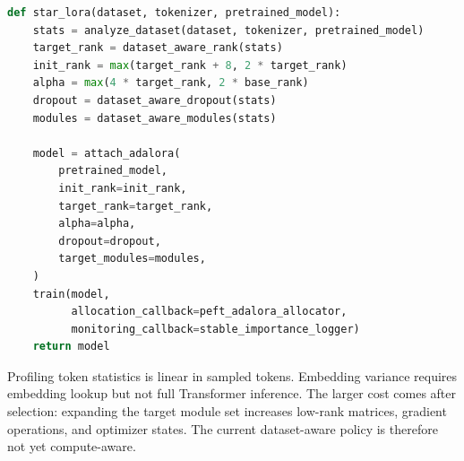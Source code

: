 \begin{lstlisting}[language=Python,caption={High-level Star-LoRA procedure.},label={lst:algorithm}]
def star_lora(dataset, tokenizer, pretrained_model):
    stats = analyze_dataset(dataset, tokenizer, pretrained_model)
    target_rank = dataset_aware_rank(stats)
    init_rank = max(target_rank + 8, 2 * target_rank)
    alpha = max(4 * target_rank, 2 * base_rank)
    dropout = dataset_aware_dropout(stats)
    modules = dataset_aware_modules(stats)

    model = attach_adalora(
        pretrained_model,
        init_rank=init_rank,
        target_rank=target_rank,
        alpha=alpha,
        dropout=dropout,
        target_modules=modules,
    )
    train(model,
          allocation_callback=peft_adalora_allocator,
          monitoring_callback=stable_importance_logger)
    return model
\end{lstlisting}

Profiling token statistics is linear in sampled tokens. Embedding variance requires embedding
lookup but not full Transformer inference. The larger cost comes after selection: expanding the
target module set increases low-rank matrices, gradient operations, and optimizer states.
The current dataset-aware policy is therefore not yet compute-aware.
